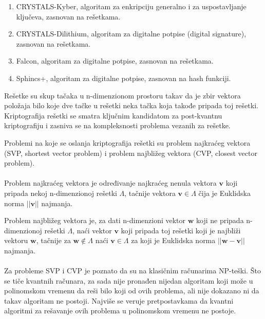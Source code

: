 \documentclass[fleqn, 12pt]{article}
\begin{document}
\begin{enumerate}
  \item CRYSTALS-Kyber, algoritam za enkripciju generalno i za uspostavljanje ključeva, zasnovan na rešetkama. \cite{G6}
  \item CRYSTALS-Dilithium, algoritam za digitalne potpise (digital signature), zasnovan na rešetkama. \cite{G6}
  \item Falcon, algoritam za digitalne potpise, zasnovan na rešetkama. \cite{G6}
  \item Sphincs+, algoritam za digitalne potpise, zasnovan na hash funkciji. \cite{G6}
\end{enumerate}

\begin{text}
Rešetke su skup tačaka u n-dimenzionom prostoru takav da je zbir vektora položaja bilo koje dve tačke u rešetki neka tačka koja takođe pripada toj rešetki. Kriptografija rešetki se smatra ključnim kandidatom za post-kvantnu kriptografiju i zasniva se na kompleksnosti problema vezanih za rešetke. \cite{G6}
\end{text}

\newpage

\begin{text}
Problemi na koje se oslanja kriptografija rešetki su problem najkraćeg vektora (SVP, shortest vector problem) i problem najbližeg vektora (CVP, closest vector problem). \cite{G6}
\\\\

Problem najkraćeg vektora je određivanje najkraćeg nenula vektora \(\mathbf{v}\) koji pripada nekoj n-dimenzionoj rešetki \(\Lambda\), tačnije vektora \(\mathbf{v} \in \Lambda\) čija je Euklidska norma \(||\mathbf{v}||\) najmanja. \cite{G6}

Problem najbližeg vektora je, za dati n-dimenzioni vektor \(\mathbf{w}\) koji ne pripada n-dimenzionoj rešetki \(\Lambda\), naći vektor \(\mathbf{v}\) koji pripada toj rešetki koji je najbliži vektoru \(\mathbf{w}\), tačnije za \(\mathbf{w} \notin \Lambda\) naći \(\mathbf{v} \in \Lambda\) za koji je Euklidska norma \(||\mathbf{w} - \mathbf{v}||\) najmanja. \cite{G6}
\\\\

Za probleme SVP i CVP je poznato da su na klasičnim računarima NP-teški. Što se tiče kvantnih računara, za sada nije pronađen nijedan algoritam koji može u polinomskom vremenu da reši bilo koji od ovih problema, ali nije dokazano ni da takav algoritam ne postoji. Najviše se veruje pretpostavkama da kvantni algoritmi za rešavanje ovih problema u polinomskom vremenu ne postoje. \cite{G6}
\end{text}
\end{document}
